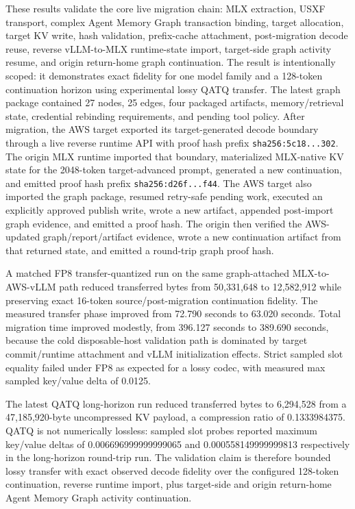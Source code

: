 \documentclass[11pt]{article}
\begin{document}
These results validate the core live migration chain: MLX extraction, USXF transport, complex Agent Memory Graph transaction binding, target allocation, target KV write, hash validation, prefix-cache attachment, post-migration decode reuse, reverse vLLM-to-MLX runtime-state import, target-side graph activity resume, and origin return-home graph continuation. The result is intentionally scoped: it demonstrates exact fidelity for one model family and a 128-token continuation horizon using experimental lossy QATQ transfer. The latest graph package contained 27 nodes, 25 edges, four packaged artifacts, memory/retrieval state, credential rebinding requirements, and pending tool policy. After migration, the AWS target exported its target-generated decode boundary through a live reverse runtime API with proof hash prefix \texttt{sha256:5c18...302}. The origin MLX runtime imported that boundary, materialized MLX-native KV state for the 2048-token target-advanced prompt, generated a new continuation, and emitted proof hash prefix \texttt{sha256:d26f...f44}. The AWS target also imported the graph package, resumed retry-safe pending work, executed an explicitly approved publish write, wrote a new artifact, appended post-import graph evidence, and emitted a proof hash. The origin then verified the AWS-updated graph/report/artifact evidence, wrote a new continuation artifact from that returned state, and emitted a round-trip graph proof hash.

A matched FP8 transfer-quantized run on the same graph-attached MLX-to-AWS-vLLM path reduced transferred bytes from 50,331,648 to 12,582,912 while preserving exact 16-token source/post-migration continuation fidelity. The measured transfer phase improved from 72.790 seconds to 63.020 seconds. Total migration time improved modestly, from 396.127 seconds to 389.690 seconds, because the cold disposable-host validation path is dominated by target commit/runtime attachment and vLLM initialization effects. Strict sampled slot equality failed under FP8 as expected for a lossy codec, with measured max sampled key/value delta of 0.0125.

The latest QATQ long-horizon run reduced transferred bytes to 6,294,528 from a 47,185,920-byte uncompressed KV payload, a compression ratio of 0.1333984375. QATQ is not numerically lossless: sampled slot probes reported maximum key/value deltas of 0.006696999999999065 and 0.000558149999999813 respectively in the long-horizon round-trip run. The validation claim is therefore bounded lossy transfer with exact observed decode fidelity over the configured 128-token continuation, reverse runtime import, plus target-side and origin return-home Agent Memory Graph activity continuation.
\end{document}
